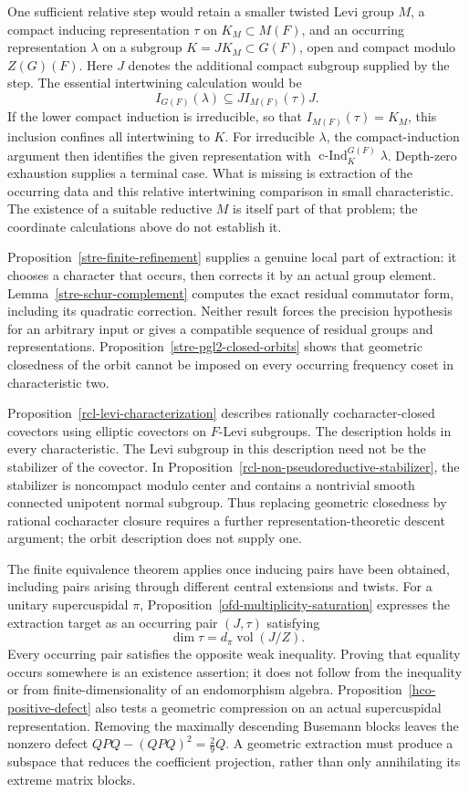 \documentclass[10pt]{amsart}
\begin{document}
One sufficient relative step would retain a smaller twisted Levi group $M$,
a compact inducing representation $\tau$ on $K_M\subset M(F)$, and an
occurring representation $\lambda$ on a subgroup $K=JK_M\subset G(F)$,
open and compact modulo $Z(G)(F)$. Here $J$ denotes the additional compact
subgroup supplied by the step. The essential intertwining calculation would be
\[
 I_{G(F)}(\lambda)\subseteq J I_{M(F)}(\tau)J.
\]
If the lower compact induction is irreducible, so that
$I_{M(F)}(\tau)=K_M$, this inclusion confines all intertwining to $K$.
For irreducible $\lambda$, the compact-induction argument then identifies
the given representation with $\operatorname{c-Ind}_K^{G(F)}\lambda$.
Depth-zero exhaustion supplies a terminal case. What is missing is extraction
of the occurring data and this relative intertwining comparison in small
characteristic. The existence of a suitable reductive $M$ is itself part
of that problem; the coordinate calculations above do not establish it.

Proposition~\ref{stre-finite-refinement} supplies a genuine local part of
extraction: it chooses a character that occurs, then corrects it by an actual
group element. Lemma~\ref{stre-schur-complement} computes the exact residual
commutator form, including its quadratic correction. Neither result forces the
precision hypothesis for an arbitrary input or gives a compatible sequence
of residual groups and representations. Proposition~\ref{stre-pgl2-closed-orbits}
shows that geometric closedness of the orbit cannot be imposed on every
occurring frequency coset in characteristic two.

Proposition~\ref{rcl-levi-characterization} describes rationally
cocharacter-closed covectors using elliptic covectors on $F$-Levi subgroups.
The description holds in every characteristic. The Levi subgroup in this
description need not be the stabilizer of the covector. In
Proposition~\ref{rcl-non-pseudoreductive-stabilizer}, the stabilizer is
noncompact modulo center and contains a nontrivial smooth connected
unipotent normal subgroup. Thus replacing geometric closedness by rational
cocharacter closure requires a further representation-theoretic descent
argument; the orbit description does not supply one.

The finite equivalence theorem applies once inducing pairs have been obtained,
including pairs arising through different central extensions and twists.
For a unitary supercuspidal $\pi$, Proposition~\ref{ofd-multiplicity-saturation}
expresses the extraction target as an occurring pair $(J,\tau)$ satisfying
\[
 \dim\tau=d_\pi\operatorname{vol}(J/Z).
\]
Every occurring pair satisfies the opposite weak inequality. Proving that
equality occurs somewhere is an existence assertion; it does not follow from
the inequality or from finite-dimensionality of an endomorphism algebra.
Proposition~\ref{hco-positive-defect} also tests a geometric compression
on an actual supercuspidal representation. Removing the maximally descending
Busemann blocks leaves the nonzero defect
$QPQ-(QPQ)^2=\tfrac29Q$. A geometric extraction must produce a subspace
that reduces the coefficient projection, rather than only annihilating its
extreme matrix blocks.
\end{document}
